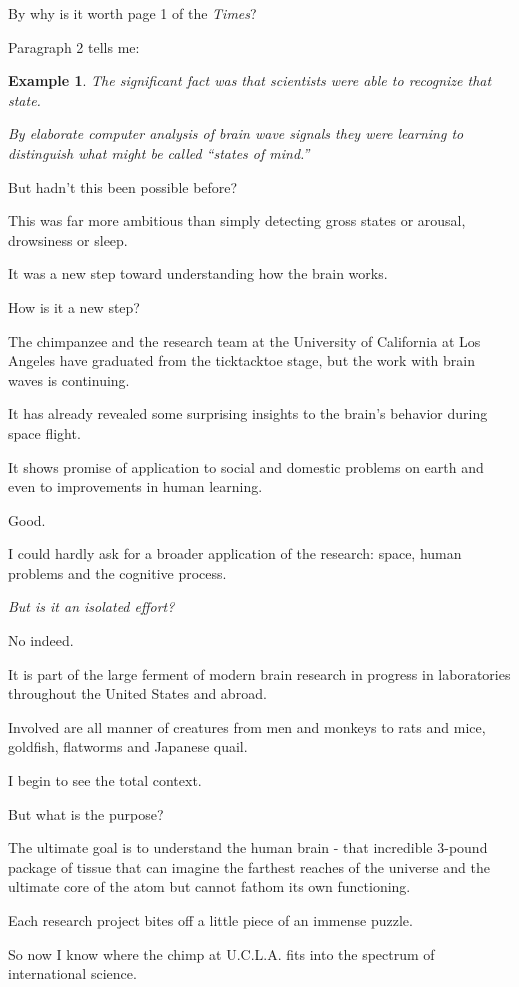 \documentclass{book}
\numberwithin{equation}{section}
\newtheorem{example}{Example}[chapter]
\begin{document}
By why is it worth page 1 of the \textit{Times}?

Paragraph 2 tells me:
\begin{example}
    The significant fact was that scientists were able to recognize that state.
    
    By elaborate computer analysis of brain wave signals they were learning to distinguish what might be called ``states of mind.''
\end{example}
But hadn't this been possible before?

%
This was far more ambitious than simply detecting gross states or arousal, drowsiness or sleep.

It was a new step toward understanding how the brain works.

%
How is it a new step?

%
The chimpanzee and the research team at the University of California at Los Angeles have graduated from the ticktacktoe stage, but the work with brain waves is continuing.

It has already revealed some surprising insights to the brain's behavior during space flight.

It shows promise of application to social and domestic problems on earth and even to improvements in human learning.

%
Good.

I could hardly ask for a broader application of the research: space, human problems and the cognitive process.

\textit{But is it an isolated effort?}

No indeed.

%
It is part of the large ferment of modern brain research in progress in laboratories throughout the United States and abroad.

Involved are all manner of creatures from men and monkeys to rats and mice, goldfish, flatworms and Japanese quail.

I begin to see the total context.

But what is the purpose?

%
The ultimate goal is to understand the human brain - that incredible 3-pound package of tissue that can imagine the farthest reaches of the universe and the ultimate core of the atom but cannot fathom its own functioning.

Each research project bites off a little piece of an immense puzzle.

%
So now I know where the chimp at U.C.L.A. fits into the spectrum of international science.
\end{document}
